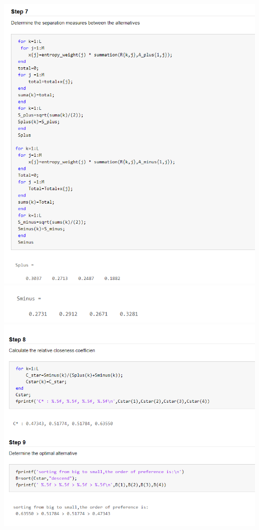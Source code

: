 \begin{flushleft}
\includegraphics[width = 16cm]{config/pictures/image18.png} 
\includegraphics[width = 16cm]{config/pictures/image19.png} 
\includegraphics[width = 16cm]{config/pictures/image20.png} 
\end{flushleft}

